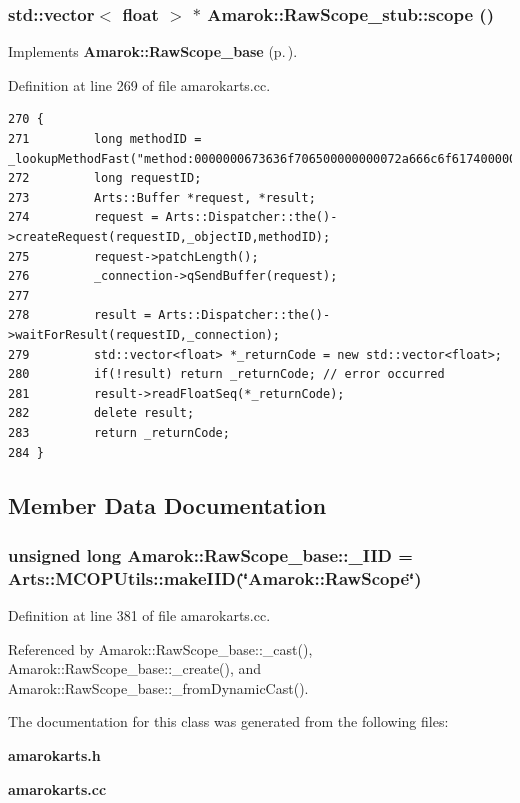 \subsubsection{\setlength{\rightskip}{0pt plus 5cm}std::vector$<$ float $>$ $\ast$ Amarok::Raw\-Scope\_\-stub::scope ()\hspace{0.3cm}{\tt  [virtual]}}\label{classAmarok_1_1RawScope__stub_Amarok_1_1RawScope__stuba3}




Implements {\bf Amarok::Raw\-Scope\_\-base} {\rm (p.\,\pageref{classAmarok_1_1RawScope__base_Amarok_1_1RawScope__skela11})}.

Definition at line 269 of file amarokarts.cc.



\footnotesize\begin{verbatim}270 {
271         long methodID = _lookupMethodFast("method:0000000673636f706500000000072a666c6f617400000000020000000000000000");
272         long requestID;
273         Arts::Buffer *request, *result;
274         request = Arts::Dispatcher::the()->createRequest(requestID,_objectID,methodID);
275         request->patchLength();
276         _connection->qSendBuffer(request);
277 
278         result = Arts::Dispatcher::the()->waitForResult(requestID,_connection);
279         std::vector<float> *_returnCode = new std::vector<float>;
280         if(!result) return _returnCode; // error occurred
281         result->readFloatSeq(*_returnCode);
282         delete result;
283         return _returnCode;
284 }
\end{verbatim}\normalsize 


\subsection{Member Data Documentation}
\subsubsection{\setlength{\rightskip}{0pt plus 5cm}unsigned long {\bf Amarok::Raw\-Scope\_\-base::\_\-IID} = Arts::MCOPUtils::make\-IID(\char`\"{}Amarok::Raw\-Scope\char`\"{})\hspace{0.3cm}{\tt  [static, inherited]}}\label{classAmarok_1_1RawScope__base_Amarok_1_1RawScope__stubs0}




Definition at line 381 of file amarokarts.cc.

Referenced by Amarok::Raw\-Scope\_\-base::\_\-cast(), Amarok::Raw\-Scope\_\-base::\_\-create(), and Amarok::Raw\-Scope\_\-base::\_\-from\-Dynamic\-Cast().

The documentation for this class was generated from the following files:\begin{CompactItemize}
\item 
{\bf amarokarts.h}\item 
{\bf amarokarts.cc}\end{CompactItemize}
